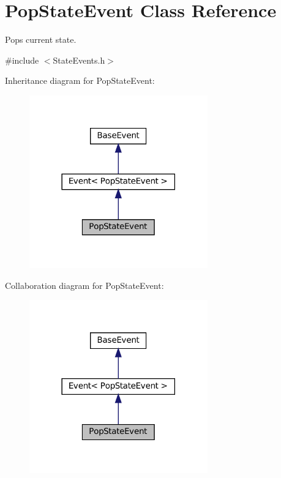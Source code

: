 \hypertarget{classPopStateEvent}{}\section{Pop\+State\+Event Class Reference}
\label{classPopStateEvent}


Pops current state.  




{\ttfamily \#include $<$State\+Events.\+h$>$}



Inheritance diagram for Pop\+State\+Event\+:
\nopagebreak
\begin{figure}[H]
\begin{center}
\leavevmode
\includegraphics[width=218pt]{classPopStateEvent__inherit__graph}
\end{center}
\end{figure}


Collaboration diagram for Pop\+State\+Event\+:
\nopagebreak
\begin{figure}[H]
\begin{center}
\leavevmode
\includegraphics[width=218pt]{classPopStateEvent__coll__graph}
\end{center}
\end{figure}
